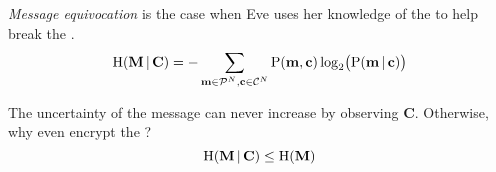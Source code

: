 \begin{definition}\label{Message_Equivocation}
  \emph{Message equivocation} is the case when Eve uses her knowledge of the  to help break the .
  \begin{equation}\label{eq:Message_Equivocation}
    \operatorname{\operatorname{H}}(\mathbf{M} \operatorname{\vert} \mathbf{C}) = - \sum\limits_{\mathbf{m} \in \operatorname{\mathcal{P}}^{N}, \mathbf{c} \in \operatorname{\mathcal{C}}^{N}} \operatorname{\operatorname{P}}(\mathbf{m}, \mathbf{c}) \log_{2} \bigl( \operatorname{\operatorname{P}}(\mathbf{m} \operatorname{\vert} \mathbf{c}) \bigr)
  \end{equation}

  \begin{remark}\label{def:Message_Equivocation_Upper_Bound}
    The uncertainty of the message can never increase by observing $\mathbf{C}$.
    Otherwise, why even encrypt the ?
    \begin{equation}\label{eq:Message_Equivocation_Upper_Bound}
      \operatorname{\operatorname{H}}(\mathbf{M} \operatorname{\vert} \mathbf{C}) \leq \operatorname{\operatorname{H}}(\mathbf{M})
    \end{equation}
  \end{remark}
\end{definition}

